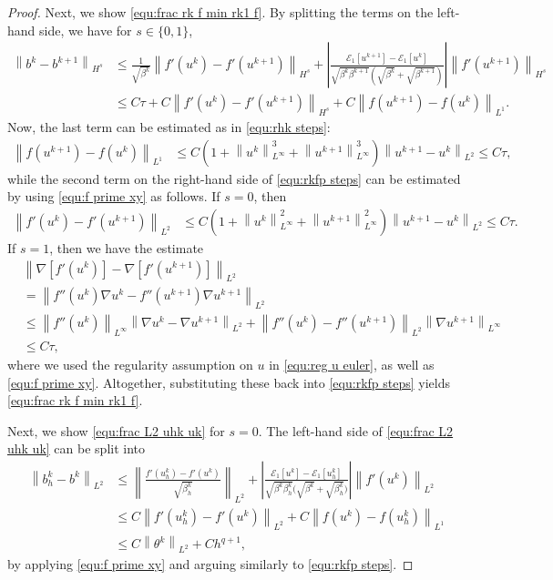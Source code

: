 \documentclass[11pt, reqno]{amsart}
\theoremstyle{definition}
\numberwithin{equation}{section}
\newcommand{\norm}[2]{\left\|{#1}\right\|_{#2}}
\newcommand{\abs}[1]{\left|{#1}\right|}
\begin{document}
\begin{proof}
Next, we show \eqref{equ:frac rk f min rk1 f}. By splitting the terms on the left-hand side, we have for $s\in\{0,1\}$,
\begin{align}\label{equ:rkfp steps}
	\norm{b^k - b^{k+1}}{H^s}
	&\leq
	\frac{1}{\sqrt{\beta^k}} \norm{f'(u^k)-f'(u^{k+1})}{H^s}
	+
	\abs{\frac{\mathcal{E}_1[u^{k+1}]- \mathcal{E}_1 [u^k]}{\sqrt{\beta^k \beta^{k+1}} \left(\sqrt{\beta^k} +\sqrt{\beta^{k+1}}\right)}}  \norm{f'(u^{k+1})}{H^s}
	\nonumber\\
	&\leq
	C\tau + C\norm{f'(u^k)-f'(u^{k+1})}{H^s}
	+
	C\norm{f(u^{k+1})-f(u^k)}{L^1}.
\end{align}
Now, the last term can be estimated as in \eqref{equ:rhk steps}:
\begin{align*}
	\norm{f(u^{k+1})-f(u^k)}{L^1}
	&\leq
	C\left(1+ \norm{u^k}{L^\infty}^3 + \norm{u^{k+1}}{L^\infty}^3 \right) \norm{u^{k+1}-u^k}{L^2}
	\leq C\tau,
\end{align*}
while the second term on the right-hand side of \eqref{equ:rkfp steps} can be estimated by using \eqref{equ:f prime xy} as follows. If $s=0$, then
\begin{align*}
	\norm{f'(u^k)-f'(u^{k+1})}{L^2}
	&\leq
	C\left(1+ \norm{u^k}{L^\infty}^2 + \norm{u^{k+1}}{L^\infty}^2 \right) \norm{u^{k+1}-u^k}{L^2}
	\leq C\tau.
\end{align*}
If $s=1$, then we have the estimate
\begin{align*}
	&\norm{\nabla \left[f'(u^k)\right] - \nabla\left[f'(u^{k+1})\right]}{L^2}
	\\
	&=
	\norm{f''(u^k)\nabla u^k- f''(u^{k+1}) \nabla u^{k+1}}{L^2}
	\\
	&\leq
	\norm{f''(u^k)}{L^\infty} \norm{\nabla u^k-\nabla u^{k+1}}{L^2}
	+
	\norm{f''(u^k)-f''(u^{k+1})}{L^2} \norm{\nabla u^{k+1}}{L^\infty}
	\\
	&\leq
	C\tau,
\end{align*}
where we used the regularity assumption on $u$ in \eqref{equ:reg u euler}, as well as \eqref{equ:f prime xy}.
Altogether, substituting these back into \eqref{equ:rkfp steps} yields \eqref{equ:frac rk f min rk1 f}.

Next, we show \eqref{equ:frac L2 uhk uk} for $s=0$. The left-hand side of \eqref{equ:frac L2 uhk uk} can be split into
\begin{align}\label{equ:fp steps uk}
	\norm{b_h^k-b^k}{L^2}
	&\leq
	\norm{\frac{f'(u_h^k)-f'(u^k)}{\sqrt{\beta_h^k}}}{L^2}
	+
	\abs{\frac{\mathcal{E}_1[u^k]- \mathcal{E}_1[u_h^k]}{\sqrt{\beta^k \beta_h^k} \Big(\sqrt{\beta^k}+ \sqrt{\beta_h^k}\Big)}} \norm{f'(u^k)}{L^2}
	\nonumber\\
	&\leq
	C\norm{f'(u_h^k)-f'(u^k)}{L^2} + C\norm{f(u^k)-f(u_h^k)}{L^1}
	\nonumber\\
	&\leq
	C\norm{\theta^k}{L^2} + Ch^{q+1},
\end{align}
by applying \eqref{equ:f prime xy} and arguing similarly to \eqref{equ:rkfp steps}.


\end{proof}
\end{document}
